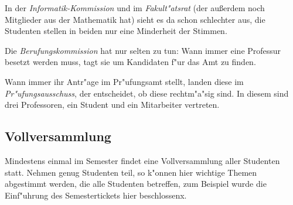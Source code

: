 In der \emph{Informatik-Kommission} und im \emph{Fakult"atsrat} (der außerdem noch Mitglieder aus der Mathematik hat) sieht es da schon schlechter aus, die Studenten stellen in beiden nur eine Minderheit der Stimmen.

Die \emph{Berufungskommission} hat nur selten zu tun:
Wann immer eine Professur besetzt werden muss, tagt sie um Kandidaten f"ur das Amt zu finden.

Wann immer ihr Antr"age im Pr"ufungsamt stellt, landen diese im \emph{Pr"ufungsausschuss}, der entscheidet, ob diese rechtm"a"sig sind.
In diesem sind drei Professoren, ein Student und ein Mitarbeiter vertreten.

\subsection*{Vollversammlung}
Mindestens einmal im Semester findet eine Vollversammlung aller Studenten statt.
Nehmen genug Studenten teil, so k"onnen hier wichtige Themen abgestimmt werden, die alle Studenten betreffen, zum Beispiel wurde die Einf"uhrung des Semestertickets hier beschlossenx.